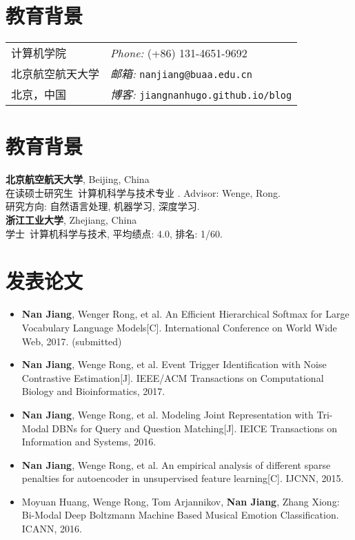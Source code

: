 \documentclass{resume}
\begin{document}




\section{教育背景}
\begin{tabular}{@{}p{3in}p{3in}}
计算机学院 & {\it Phone:}  (+86) 131-4651-9692 \\
北京航空航天大学  & {\it 邮箱:}  {\tt nanjiang@buaa.edu.cn} \\
北京，中国         & {\it 博客:} {\tt jiangnanhugo.github.io/blog} \\
\end{tabular}


\section{教育背景}
{\bf 北京航空航天大学}, Beijing,  China\\
在读硕士研究生\ 计算机科学与技术专业 . Advisor:  Wenge, Rong.\\
研究方向: 自然语言处理, 机器学习, 深度学习. \\


{\bf 浙江工业大学}, Zhejiang, China\\
学士\ 计算机科学与技术, 平均绩点: 4.0, 排名: 1/60.


\section{发表论文}
\begin{itemize}
\item \textbf{Nan Jiang}, Wenger Rong, et al. An Efficient Hierarchical Softmax for Large Vocabulary Language Models[C]. International Conference on World Wide Web, 2017. (submitted)
\item \textbf{Nan Jiang}, Wenge Rong, et al. Event Trigger Identification with Noise Contrastive Estimation[J]. IEEE/ACM Transactions on Computational Biology and Bioinformatics, 2017.

\item \textbf{Nan Jiang}, Wenge Rong, et al. Modeling Joint Representation with Tri-Modal DBNs for Query and Question Matching[J]. IEICE Transactions on Information and Systems, 2016.

\item \textbf{Nan Jiang}, Wenge Rong, et al. An empirical analysis of different sparse penalties for autoencoder in unsupervised feature learning[C]. IJCNN, 2015.

\item Moyuan Huang, Wenge Rong, Tom Arjannikov, \textbf{Nan Jiang}, Zhang Xiong: Bi-Modal Deep Boltzmann Machine Based Musical Emotion Classification. ICANN, 2016.
\end{itemize}
\end{document}
